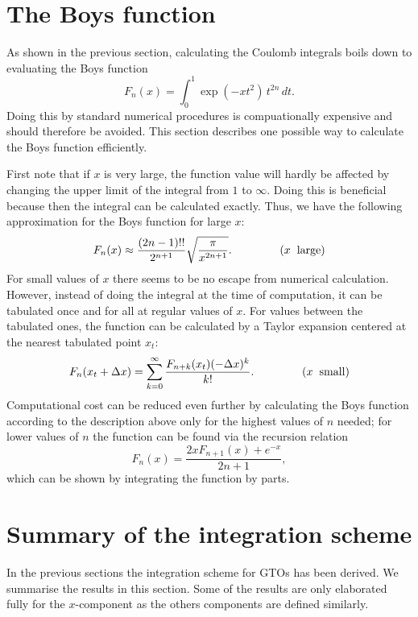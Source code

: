 \section{The Boys function}
\label{section:Boys}

As shown in the previous section, calculating the Coulomb integrals boils down to evaluating the Boys function
\begin{equation}
\label{eq:boys}
 F_n(x) = \int_0^1\exp(-xt^2)\,t^{2n}\,dt.
\end{equation}
Doing this by standard numerical procedures is compuationally
expensive and should therefore be avoided. This section describes one possible way to calculate the Boys function efficiently.

First note that if $x$ is very large, the function value will hardly be affected by changing the upper limit of the integral from $1$ to $\infty$. Doing this is beneficial
because then the integral can be calculated exactly. Thus, we have the following approximation for the Boys function for large $x$:
\begin{equation}
 F_n(x) \approx \frac{(2n-1)!!}{2^{n+1}}\sqrt{\frac{\pi}{x^{2n+1}}}. \hspace{15mm} (x\hspace{2mm}\mathrm{large})
\end{equation}
For small values of $x$ there seems to be no escape from numerical calculation. However, instead of doing the integral at the time of computation, 
it can be tabulated once and for all at regular values of $x$. For values between the tabulated ones, the function can be calculated by a Taylor expansion centered at the nearest tabulated point $x_t$:
\begin{equation}
 F_n(x_t+\Delta x) = \sum_{k=0}^\infty\frac{F_{n+k}(x_t) (-\Delta x)^k}{k!}. \hspace{15mm} (x\hspace{2mm}\mathrm{small})
\end{equation}
Computational cost can be reduced even further by calculating the Boys function according to the description above only for the highest values of $n$ needed; for lower values of $n$ the function
can be found via the recursion relation
\begin{equation}
 F_n(x) = \frac{2xF_{n+1}(x)+e^{-x}}{2n+1},
\end{equation}
which can be shown by integrating the function by parts.


\section{Summary of the integration scheme}
In the previous sections the integration scheme for GTOs has been derived. We summarise the results in this section. Some of the results are only elaborated fully for the $x$-component as
the others components are defined similarly.

